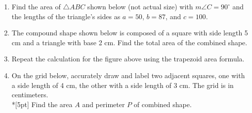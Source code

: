 \begin{enumerate}
\item Find the area of $\triangle ABC$ shown below (not actual size) with $m\angle C=90^\circ$ and the lengths of the triangle's sides as $a=50$, $b=87$, and $c=100$. \par \medskip

\item The compound shape shown below is composed of a square with side length 5 cm and a triangle with base 2 cm. Find the total area of the combined shape.
  \vspace{1cm} 
  \begin{flushleft}
  \end{flushleft} \vspace{1cm}
\item Repeat the calculation for the figure above using the trapezoid area formula. \vspace{1cm}

\item On the grid below, accurately draw and label two adjacent squares, one with a side length of 4 cm, the other with a side length of 3 cm. The grid is in centimeters.\\*[5pt]
  Find the area $A$ and perimeter $P$ of combined shape.
  \begin{flushleft}
  \end{flushleft}


\end{enumerate}
